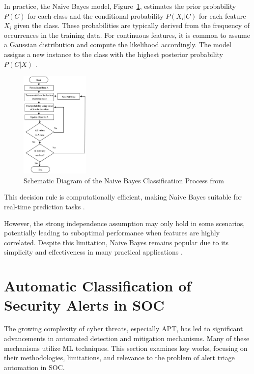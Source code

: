 In practice, the Naive Bayes model, Figure~\ref{fig:naive_bayes}, estimates the prior probability \( P(C) \) for each class and the conditional probability \( P(X_i|C) \) for each feature \( X_i \) given the class. 
These probabilities are typically derived from the frequency of occurrences in the training data. 
For continuous features, it is common to assume a Gaussian distribution and compute the likelihood accordingly. 
The model assigns a new instance to the class with the highest posterior probability \( P(C|X) \) \parencite{Nila2020, Chandra2016}.

\begin{figure}[h!]
    \centering
    \includegraphics[width=0.3\textwidth]{ch2/assets/Flow-chart-for-Naive-Bayesian-classification.png}
    \caption{Schematic Diagram of the Naive Bayes Classification Process from \parencite{Sneha2019}}
    \label{fig:naive_bayes}
\end{figure}

This decision rule is computationally efficient, making Naive Bayes suitable for real-time prediction tasks \parencite{Nila2020, Chandra2016}. 

However, the strong independence assumption may only hold in some scenarios, potentially leading to suboptimal performance when features are highly correlated. 
Despite this limitation, Naive Bayes remains popular due to its simplicity and effectiveness in many practical applications \parencite{Chandra2016}.

\section{Automatic Classification of Security Alerts in SOC}

The growing complexity of cyber threats, especially \gls{APT}, has led to significant advancements in automated detection and mitigation mechanisms. 
Many of these mechanisms utilize \gls{ML} techniques. 
This section examines key works, focusing on their methodologies, limitations, and relevance to the problem of alert triage automation in \gls{SOC}.

